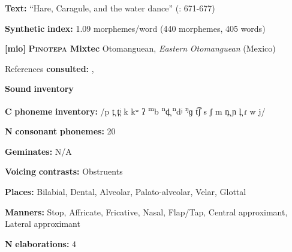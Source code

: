 \begin{styleBody}
\textbf{Text:} “Hare, Caragule, and the water dance” (\citealt{BlackingsFabb2003}: 671-677)
\end{styleBody}

\begin{styleBody}
\textbf{Synthetic} \textbf{index:} 1.09 morphemes/word (440 morphemes, 405 words)
\end{styleBody}

\begin{styleBody}
\textbf{[mio]}   \textbf{\textsc{Pinotepa} \textbf{Mixtec}}  Otomanguean, \textit{Eastern} \textit{Otomanguean} (Mexico)
\end{styleBody}

\begin{styleBody}
References \textbf{consulted:} \citet{Bradley1971}, \citet{Costello2014}
\end{styleBody}

\begin{styleBody}
\textbf{Sound} \textbf{inventory}
\end{styleBody}

\begin{styleBody}
\textbf{C} \textbf{phoneme} \textbf{inventory:} /p t̪ t̪ʲ k kʷ ʔ \textsuperscript{m}b \textsuperscript{n}d̪ \textsuperscript{n}dʲ \textsuperscript{ŋ}ɡ t͡ʃ s ʃ m n̪ ɲ l̪ ɾ w j/
\end{styleBody}

\begin{styleBody}
\textbf{N} \textbf{consonant} \textbf{phonemes:} 20
\end{styleBody}

\begin{styleBody}
\textbf{Geminates:} N/A
\end{styleBody}

\begin{styleBody}
\textbf{Voicing} \textbf{contrasts:} Obstruents
\end{styleBody}

\begin{styleBody}
\textbf{Places:} Bilabial, Dental, Alveolar, Palato-alveolar, Velar, Glottal
\end{styleBody}

\begin{styleBody}
\textbf{Manners:} Stop, Affricate, Fricative, Nasal, Flap/Tap, Central approximant, Lateral approximant
\end{styleBody}

\begin{styleBody}
\textbf{N} \textbf{elaborations:} 4
\end{styleBody}

